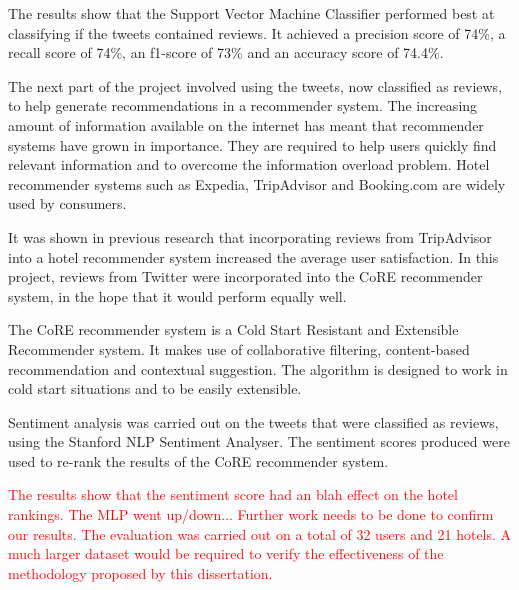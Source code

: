 The results show that the Support Vector Machine Classifier performed best at classifying if the tweets contained reviews. It achieved a precision score of 74\%, a recall score of 74\%, an f1-score of 73\% and an accuracy score of 74.4\%.

The next part of the project involved using the tweets, now classified as reviews, to help generate recommendations in a recommender system. The increasing amount of information available on the internet has meant that recommender systems have grown in importance. They are required to help users quickly find relevant information and to overcome the information overload problem. Hotel recommender systems such as Expedia, TripAdvisor and Booking.com are widely used by consumers.

It was shown in previous research that incorporating reviews from TripAdvisor into a hotel recommender system increased the average user satisfaction. In this project, reviews from Twitter were incorporated into the CoRE recommender system, in the hope that it would perform equally well.

The CoRE recommender system is a Cold Start Resistant and Extensible Recommender system. It makes use of collaborative filtering, content-based recommendation and contextual suggestion. The algorithm is designed to work in cold start situations and to be easily extensible.

Sentiment analysis was carried out on the tweets that were classified as reviews, using the Stanford NLP Sentiment Analyser. The sentiment scores produced were used to re-rank the results of the CoRE recommender system.

\textcolor{red}{The results show that the sentiment score had an blah effect on the hotel rankings. The MLP went up/down... Further work needs to be done to confirm our results. The evaluation was carried out on a total of 32 users and 21 hotels. A much larger dataset would be required to verify the effectiveness of the methodology proposed by this dissertation.}
